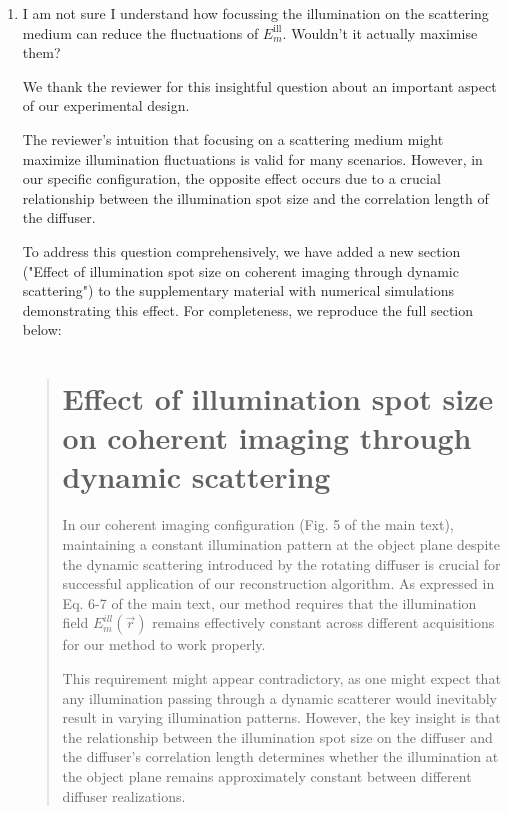 \documentclass[12pt]{article}
\newenvironment{solved_reviewercomment}
    {\begin{tcolorbox}[width=\linewidth,colback=gray!5,colframe=solved_commentcolor!50,title=Reviewer Comment,left=5pt,right=5pt]}
    {\end{tcolorbox}}
\newenvironment{ourresponse}
    {\begin{tcolorbox}[width=\linewidth,breakable,enhanced,colback=gray!5,colframe=responsecolor!50,title=Response,left=5pt,right=5pt]}
    {\end{tcolorbox}}
\begin{document}
\begin{enumerate}[label=\arabic*.]
\begin{enumerate}[label=3.\alph*.]
        
        
        \item \leavevmode\vspace{-\baselineskip}
        \begin{solved_reviewercomment}
            I am not sure I understand how focussing the illumination on the scattering medium can reduce the fluctuations of \(E^{\text{ill}}_m\). Wouldn't it actually maximise them?    
        \end{solved_reviewercomment}
        \begin{ourresponse}
        We thank the reviewer for this insightful question about an important aspect of our experimental design.
        
        The reviewer's intuition that focusing on a scattering medium might maximize illumination fluctuations is valid for many scenarios. However, in our specific configuration, the opposite effect occurs due to a crucial relationship between the illumination spot size and the correlation length of the diffuser.
        
        To address this question comprehensively, we have added a new section ("Effect of illumination spot size on coherent imaging through dynamic scattering") to the supplementary material with numerical simulations demonstrating this effect. For completeness, we reproduce the full section below:
        \begin{quote}
            \section*{Effect of illumination spot size on coherent imaging through dynamic scattering}
        
        In our coherent imaging configuration (Fig. 5 of the main text), maintaining a constant illumination pattern at the object plane despite the dynamic scattering introduced by the rotating diffuser is crucial for successful application of our reconstruction algorithm. As expressed in Eq. 6-7 of the main text, our method requires that the illumination field $E_m^{ill}(\vec{r})$ remains effectively constant across different acquisitions for our method to work properly.
        
        This requirement might appear contradictory, as one might expect that any illumination passing through a dynamic scatterer would inevitably result in varying illumination patterns. However, the key insight is that the relationship between the illumination spot size on the diffuser and the diffuser's correlation length determines whether the illumination at the object plane remains approximately constant between different diffuser realizations.
        

\end{quote}
\end{ourresponse}
\end{enumerate}
\end{enumerate}
\end{document}
